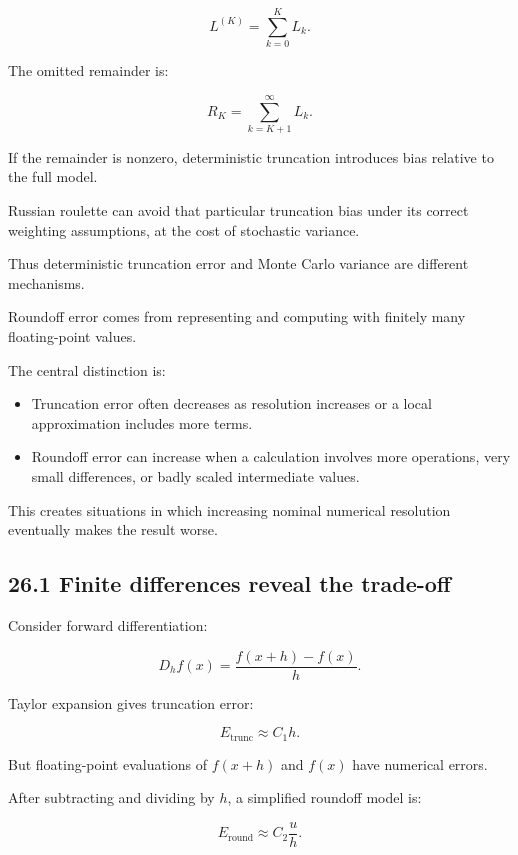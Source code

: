 \[ L^{(K)}=\sum_{k=0}^{K}L_k. \]

The omitted remainder is:

\[ \boxed{ R_K=\sum_{k=K+1}^{\infty}L_k }. \]

If the remainder is nonzero, deterministic truncation introduces bias relative to the full model.

Russian roulette can avoid that particular truncation bias under its correct weighting assumptions, at the cost of stochastic variance.

Thus deterministic truncation error and Monte Carlo variance are different mechanisms.

Roundoff error comes from representing and computing with finitely many floating-point values.

The central distinction is:

\begin{itemize}
\tightlist
\item
  Truncation error often decreases as resolution increases or a local approximation includes more terms.
\item
  Roundoff error can increase when a calculation involves more operations, very small differences, or badly scaled intermediate values.
\end{itemize}

This creates situations in which increasing nominal numerical resolution eventually makes the result worse.

\subsection{26.1 Finite differences reveal the trade-off}\label{02-foundations-ii-ch029-finite-differences-reveal-the-trade-off}

\hypertarget{02-foundations-ii-ch029-finite-differences-reveal-the-trade-off}{}

Consider forward differentiation:

\[ D_hf(x)= \frac{f(x+h)-f(x)}{h}. \]

Taylor expansion gives truncation error:

\[ \boxed{ E_{\mathrm{trunc}}\approx C_1h }. \]

But floating-point evaluations of \(f(x+h)\) and \(f(x)\) have numerical errors.

After subtracting and dividing by \(h\), a simplified roundoff model is:

\[ \boxed{ E_{\mathrm{round}}\approx C_2\frac uh }. \]

